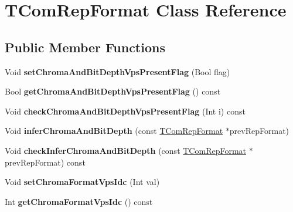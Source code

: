 \hypertarget{class_t_com_rep_format}{}\section{T\+Com\+Rep\+Format Class Reference}
\label{class_t_com_rep_format}
\subsection*{Public Member Functions}
\begin{DoxyCompactItemize}
\item 
\mbox{\label{class_t_com_rep_format_a3749300b5e03e11d1bc989f89fd0e0ab}} 
Void {\bfseries set\+Chroma\+And\+Bit\+Depth\+Vps\+Present\+Flag} (Bool flag)
\item 
\mbox{\label{class_t_com_rep_format_aaf6c0c0edf4bd1122dc95efb1a766424}} 
Bool {\bfseries get\+Chroma\+And\+Bit\+Depth\+Vps\+Present\+Flag} () const
\item 
\mbox{\label{class_t_com_rep_format_abcdfb71d95cf755c4f6abcd076b47b84}} 
Void {\bfseries check\+Chroma\+And\+Bit\+Depth\+Vps\+Present\+Flag} (Int i) const
\item 
\mbox{\label{class_t_com_rep_format_ab84df96ec22d61653ce114e32ab990d7}} 
Void {\bfseries infer\+Chroma\+And\+Bit\+Depth} (const \hyperlink{class_t_com_rep_format}{T\+Com\+Rep\+Format} $\ast$prev\+Rep\+Format)
\item 
\mbox{\label{class_t_com_rep_format_a70583786455fa4545200a5c12710eee0}} 
Void {\bfseries check\+Infer\+Chroma\+And\+Bit\+Depth} (const \hyperlink{class_t_com_rep_format}{T\+Com\+Rep\+Format} $\ast$prev\+Rep\+Format) const
\item 
\mbox{\label{class_t_com_rep_format_ad1bb37fac2b62bb4811396bad68e59c5}} 
Void {\bfseries set\+Chroma\+Format\+Vps\+Idc} (Int val)
\item 
\mbox{\label{class_t_com_rep_format_a797dc647d6bc03a7485a8f38da3edea0}} 
Int {\bfseries get\+Chroma\+Format\+Vps\+Idc} () const
\item 
\mbox{\label{class_t_com_rep_format_a99c48fc30dc6ecdd004ead2ca4f98799}} 

\end{DoxyCompactItemize}
